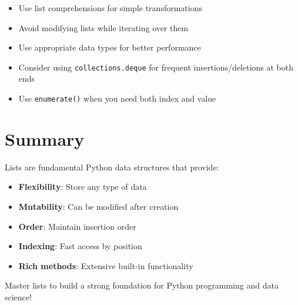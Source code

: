 \documentclass[12pt,a4paper]{article}
\begin{document}
\begin{itemize}
    \item Use list comprehensions for simple transformations
    \item Avoid modifying lists while iterating over them
    \item Use appropriate data types for better performance
    \item Consider using \texttt{collections.deque} for frequent insertions/deletions at both ends
    \item Use \texttt{enumerate()} when you need both index and value
\end{itemize}

\section{Summary}

Lists are fundamental Python data structures that provide:
\begin{itemize}
    \item \textbf{Flexibility}: Store any type of data
    \item \textbf{Mutability}: Can be modified after creation
    \item \textbf{Order}: Maintain insertion order
    \item \textbf{Indexing}: Fast access by position
    \item \textbf{Rich methods}: Extensive built-in functionality
\end{itemize}

Master lists to build a strong foundation for Python programming and data science!
\end{document}
